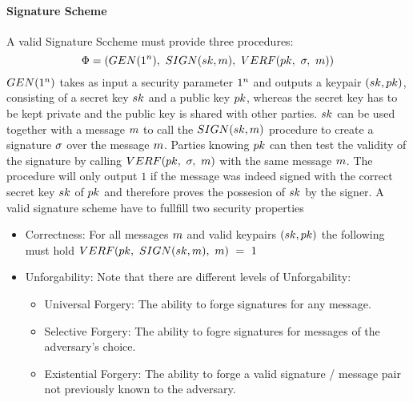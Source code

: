 \paragraph{Signature Scheme}
A valid Signature Sccheme must provide three procedures:
\[ \Phi = (GEN(1^n) ,~ SIGN(sk, m) ,~ VERF(pk ,~ \sigma ,~ m)) \]
$GEN(1^n)$ takes as input a security parameter $1^n$ and outputs a keypair $(sk, pk)$, consisting of a secret key $sk$ and a public key $pk$, whereas
the secret key has to be kept private and the public key is shared with other parties.
$sk$ can be used together with a message $m$ to call the $SIGN(sk, m)$ procedure to create a signature $\sigma$ over the message $m$.
Parties knowing $pk$ can then test the validity of the signature by calling $VERF(pk ,~ \sigma ,~ m)$ with the same message $m$. The procedure will only output $1$ if the message was
indeed signed with the correct secret key $sk$ of $pk$ and therefore proves the possesion of $sk$ by the signer.
A valid signature scheme have to fullfill two security properties
\begin{itemize}
    \item Correctness: For all messages $m$ and valid keypairs $(sk, pk)$ the following must hold $VERF(pk ,~ SIGN(sk, m) ,~ m) ~=~ 1$
    \item Unforgability: Note that there are different levels of Unforgability:~\cite{goldwasser1988digital}
    \begin{itemize}
        \item Universal Forgery: The ability to forge signatures for any message.
        \item Selective Forgery: The ability to fogre signatures for messages of the adversary's choice.
        \item Existential Forgery: The ability to forge a valid signature / message pair not previously known to the adversary.
    \end{itemize}
\end{itemize}

